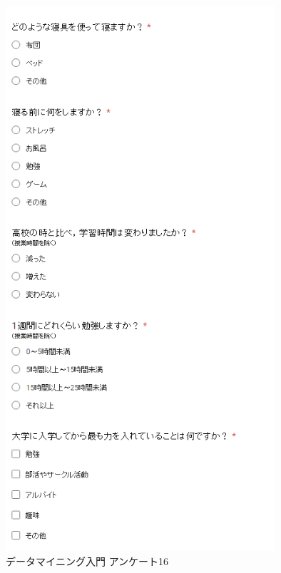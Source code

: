 \begin{figure}[p]
\centering
\includegraphics[width=10cm]{forms16.PNG}
\caption{データマイニング入門 アンケート16}\label{サンプル図}
\end{figure}

